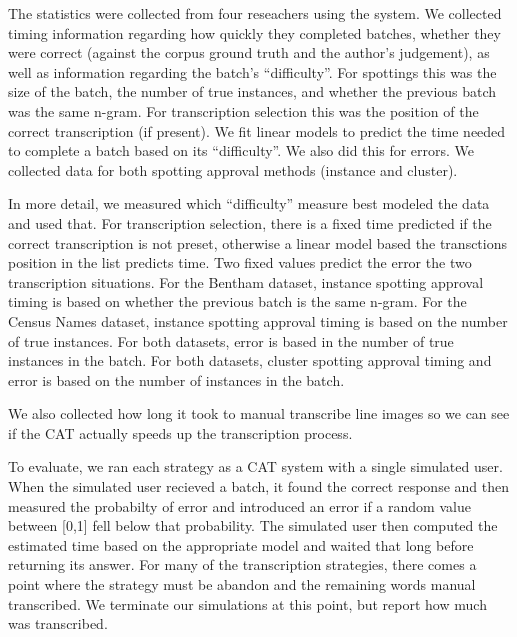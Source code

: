 \documentclass[ms,electronic,twosidetoc,letterpaper,chaptercenter,parttop,lof,lot]{byumsphd}
\begin{document}
The statistics were collected from four reseachers
using the system. We collected timing information regarding how quickly they completed batches, whether they were correct (against the corpus ground truth and the author's judgement), as well as information regarding the batch's ``difficulty''. For spottings this was the size of the batch, the number of true instances, and whether the previous batch was the same n-gram. For transcription selection this was the position of the correct transcription (if present). 
We fit linear models to predict the time needed to complete a batch based on its ``difficulty''. We also did this for errors.
We collected data for both spotting approval methods (instance and cluster).

In more detail, we measured which ``difficulty'' measure best modeled the data and used that. For transcription selection, there is a fixed time predicted if the correct transcription is not preset, otherwise a linear model based the transctions position in the list predicts time. Two fixed values predict the error the two transcription situations. 
For the Bentham dataset, instance spotting approval timing is based on whether the previous batch is the same n-gram. For the Census Names dataset, instance spotting approval timing is based on the number of true instances. For both datasets, error is based in the number of true instances in the batch. For both datasets, cluster spotting approval timing and error is based on the number of instances in the batch.

We also collected how long it took to manual transcribe line images so we can see if the CAT actually speeds up the transcription process.

To evaluate, we ran each strategy as a CAT system with a single simulated user. When the simulated user recieved a batch, it found the correct response and then measured the probabilty of error and introduced an error if a random value between [0,1] fell below that probability. The simulated user then computed the estimated time based on the appropriate model and waited that long before returning its answer. For many of the transcription strategies, there comes a point where the strategy must be abandon and the remaining words manual transcribed. We terminate our simulations at this point, but report how much was transcribed.
\end{document}
